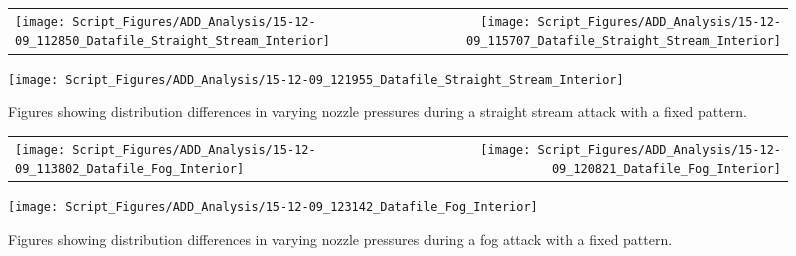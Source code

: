 \documentclass{article}
\begin{document}


\begin{figure}[ht]
\begin{tabular*}{\textwidth}{lr}
\texttt{[image: Script\_Figures/ADD\_Analysis/15-12-09\_112850\_Datafile\_Straight\_Stream\_Interior]} &
\texttt{[image: Script\_Figures/ADD\_Analysis/15-12-09\_115707\_Datafile\_Straight\_Stream\_Interior]} \\
\end{tabular*}
\centering
\texttt{[image: Script\_Figures/ADD\_Analysis/15-12-09\_121955\_Datafile\_Straight\_Stream\_Interior]}
\caption{Figures showing distribution differences in varying nozzle pressures during a straight stream attack with a fixed pattern.}
\label{fig:Interior_Varying_Nozzle_Pressure_SS_Fixed_Pattern}
\end{figure}

\clearpage


\begin{figure}[ht]
\begin{tabular*}{\textwidth}{lr}
\texttt{[image: Script\_Figures/ADD\_Analysis/15-12-09\_113802\_Datafile\_Fog\_Interior]} &
\texttt{[image: Script\_Figures/ADD\_Analysis/15-12-09\_120821\_Datafile\_Fog\_Interior]} \\
\end{tabular*}
\centering
\texttt{[image: Script\_Figures/ADD\_Analysis/15-12-09\_123142\_Datafile\_Fog\_Interior]}
\caption{Figures showing distribution differences in varying nozzle pressures during a fog attack with a fixed pattern.}
\label{fig:Interior_Varying_Nozzle_Pressure_Fog_Fixed_Pattern}
\end{figure}

\clearpage

\end{document}
